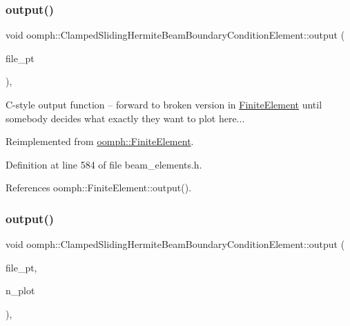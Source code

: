 \subsubsection{\texorpdfstring{output()}{output()}\hspace{0.1cm}{\footnotesize\ttfamily [3/4]}}
{\footnotesize\ttfamily void oomph\+::\+Clamped\+Sliding\+Hermite\+Beam\+Boundary\+Condition\+Element\+::output (\begin{DoxyParamCaption}\item[{F\+I\+LE $\ast$}]{file\+\_\+pt }\end{DoxyParamCaption})\hspace{0.3cm}{\ttfamily [inline]}, {\ttfamily [virtual]}}

C-\/style output function -- forward to broken version in \hyperlink{classoomph_1_1FiniteElement}{Finite\+Element} until somebody decides what exactly they want to plot here... 

Reimplemented from \hyperlink{classoomph_1_1FiniteElement_a72cddd09f8ddbee1a20a1ff404c6943e}{oomph\+::\+Finite\+Element}.



Definition at line 584 of file beam\+\_\+elements.\+h.



References oomph\+::\+Finite\+Element\+::output().

\mbox{\label{classoomph_1_1ClampedSlidingHermiteBeamBoundaryConditionElement_a14464bc8c32618741eefea80493f5a8d}} 
\subsubsection{\texorpdfstring{output()}{output()}\hspace{0.1cm}{\footnotesize\ttfamily [4/4]}}
{\footnotesize\ttfamily void oomph\+::\+Clamped\+Sliding\+Hermite\+Beam\+Boundary\+Condition\+Element\+::output (\begin{DoxyParamCaption}\item[{F\+I\+LE $\ast$}]{file\+\_\+pt,  }\item[{const unsigned \&}]{n\+\_\+plot }\end{DoxyParamCaption})\hspace{0.3cm}{\ttfamily [inline]}, {\ttfamily [virtual]}}



